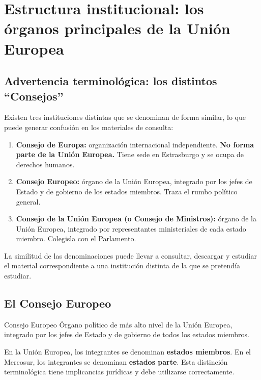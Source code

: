 \documentclass[12pt,oneside]{book}
\begin{document}
\chapter[Órganos principales de la UE]{Estructura institucional: los órganos principales de la Unión Europea}

\section{Advertencia terminológica: los distintos ``Consejos''}

Existen tres instituciones distintas que se denominan de forma similar, lo que puede generar confusión en los materiales de consulta:

\begin{important}
\begin{enumerate}
    \item \textbf{Consejo de Europa:} organización internacional independiente. \textbf{No forma parte de la Unión Europea.} Tiene sede en Estrasburgo y se ocupa de derechos humanos.
    \item \textbf{Consejo Europeo:} órgano de la Unión Europea, integrado por los jefes de Estado y de gobierno de los estados miembros. Traza el rumbo político general.
    \item \textbf{Consejo de la Unión Europea (o Consejo de Ministros):} órgano de la Unión Europea, integrado por representantes ministeriales de cada estado miembro. Colegisla con el Parlamento.
\end{enumerate}
\end{important}

La similitud de las denominaciones puede llevar a consultar, descargar y estudiar el material correspondiente a una institución distinta de la que se pretendía estudiar.

\section{El Consejo Europeo}

\begin{definition}{Consejo Europeo}
Órgano político de más alto nivel de la Unión Europea, integrado por los jefes de Estado y de gobierno de todos los estados miembros.
\end{definition}

\begin{important}
En la Unión Europea, los integrantes se denominan \textbf{estados miembros}. En el Mercosur, los integrantes se denominan \textbf{estados parte}. Esta distinción terminológica tiene implicancias jurídicas y debe utilizarse correctamente.
\end{important}
\end{document}
